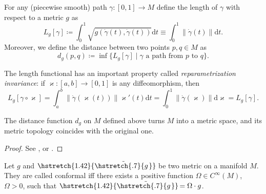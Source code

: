 \documentclass[english,letterpaper]{article}%
\numberwithin{equation}{section}
\numberwithin{figure}{section}
\numberwithin{table}{section}
\theoremstyle{definition}
\theoremstyle{definition}
\theoremstyle{definition}
\theoremstyle{plain}
\theoremstyle{plain}
\theoremstyle{plain}
\theoremstyle{plain}
\theoremstyle{remark}
\theoremstyle{remark}
\newcommand{\dd}{{\mathrm{d}}}
\newcommand\wt[1]{\hstretch{1.42}{\tilde{\hstretch{.7}{#1\mkern2mu}}}\mkern-2mu}
\begin{document}
\begin{defn}
    For any (piecewise smooth) path $\gamma:[0,1]\to M$ define the length of $\gamma$ with respect to a metric $g$ as
    \[L_g[\gamma]\coloneqq \int_0^1 \sqrt{g(\dot\gamma(t),\dot\gamma(t))}\dd t \equiv \int_0^1 \lVert\dot\gamma(t)\rVert \dd t.\]
    Moreover, we define the distance between two points $p,q\in M$ as 
    \[d_g(p,q)\coloneqq \inf\{L_g[\gamma]\mid \gamma \text{ a path from $p$ to $q$}\}.\]
\end{defn}

The length functional has an important property called \emph{reparametrization invariance}: if $\varkappa:[a,b]\to[0,1]$ is any diffeomorphism, then 
\[L_g[\gamma\circ\varkappa]=\int_a^b  \lVert\dot\gamma(\varkappa(t))\rVert \varkappa' (t)\dd t=\int_0^1 \lVert\dot\gamma(\varkappa)\rVert \dd \varkappa = L_g[\gamma].\]


\begin{thm}
    The distance function $d_g$ on $M$ defined above turns $M$ into a metric space, and its metric topology coincides with the original one.
\end{thm}
\begin{proof}
    See \cite[Thm. 13.29]{Lee}, \cite[Lm. 6.2]{LieRiem} or \cite[Lm. 1.4.1]{Jost}.
\end{proof}


\begin{defn}
    Let $g$ and $\wt{g}$ be two metric on a manifold $M$. They are called conformal iff there exists a positive function $\Omega\in C^\infty(M)$, $\Omega>0$, such that $\wt{g}=\Omega\cdot g$.
\end{defn}
\end{document}
